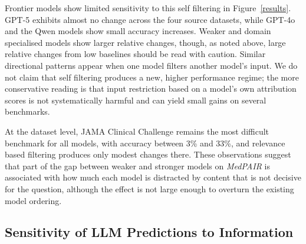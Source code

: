 \documentclass[fleqn,10pt]{wlscirep}
\begin{document}
Frontier models show limited sensitivity to this self filtering in Figure~\ref{results}. GPT-5 exhibits almost no change across the four source datasets, while GPT-4o and the Qwen models show small accuracy increases. Weaker and domain specialised models show larger relative changes, though, as noted above, large relative changes from low baselines should be read with caution. Similar directional patterns appear when one model filters another model's input. We do not claim that self filtering produces a new, higher performance regime; the more conservative reading is that input restriction based on a model's own attribution scores is not systematically harmful and can yield small gains on several benchmarks.

At the dataset level, JAMA Clinical Challenge remains the most difficult benchmark for all models, with accuracy between 3\% and 33\%, and relevance based filtering produces only modest changes there. These observations suggest that part of the gap between weaker and stronger models on \emph{MedPAIR} is associated with how much each model is distracted by content that is not decisive for the question, although the effect is not large enough to overturn the existing model ordering.

\subsection{Sensitivity of LLM Predictions to Information}
\end{document}
